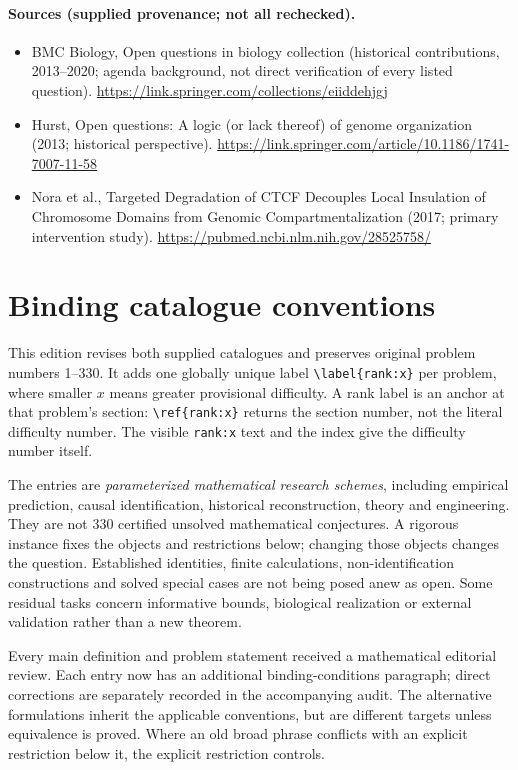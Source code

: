 \documentclass[11pt]{article}
\begin{document}
\paragraph{Sources (supplied provenance; not all rechecked).}
\begin{itemize}
\item BMC Biology, Open questions in biology collection (historical contributions, 2013--2020; agenda background, not direct verification of every listed question). \url{https://link.springer.com/collections/eiiddehjgj}
\item Hurst, Open questions: A logic (or lack thereof) of genome organization (2013; historical perspective). \url{https://link.springer.com/article/10.1186/1741-7007-11-58}
\item Nora et al., Targeted Degradation of CTCF Decouples Local Insulation of Chromosome Domains from Genomic Compartmentalization (2017; primary intervention study). \url{https://pubmed.ncbi.nlm.nih.gov/28525758/}
\end{itemize}


\section*{Binding catalogue conventions}
This edition revises both supplied catalogues and preserves original problem numbers 1--330. It adds one globally unique label \verb|\label{rank:x}| per problem, where smaller $x$ means greater provisional difficulty. A rank label is an anchor at that problem's section: \verb|\ref{rank:x}| returns the section number, not the literal difficulty number. The visible \texttt{rank:x} text and the index give the difficulty number itself.

The entries are \emph{parameterized mathematical research schemes}, including empirical prediction, causal identification, historical reconstruction, theory and engineering. They are not 330 certified unsolved mathematical conjectures. A rigorous instance fixes the objects and restrictions below; changing those objects changes the question. Established identities, finite calculations, non-identification constructions and solved special cases are not being posed anew as open. Some residual tasks concern informative bounds, biological realization or external validation rather than a new theorem.

Every main definition and problem statement received a mathematical editorial review. Each entry now has an additional binding-conditions paragraph; direct corrections are separately recorded in the accompanying audit. The alternative formulations inherit the applicable conventions, but are different targets unless equivalence is proved. Where an old broad phrase conflicts with an explicit restriction below it, the explicit restriction controls.
\end{document}
